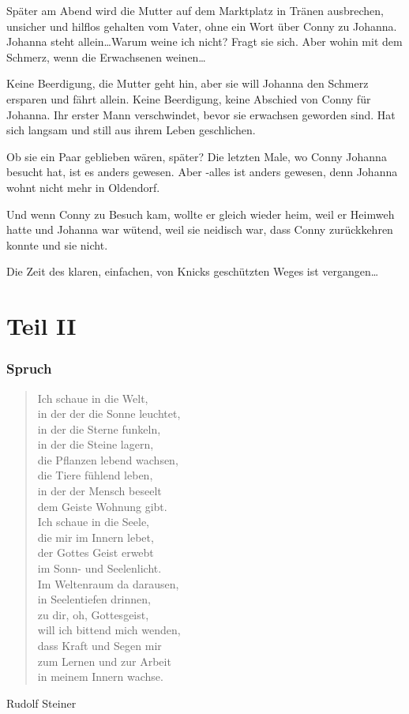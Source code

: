 \documentclass[10pt,a5paper]{book}
\newenvironment{dichter}{\begin{flushright}}{\end{flushright}}
\begin{document}
Später am Abend wird die Mutter auf dem Marktplatz in Tränen ausbrechen, unsicher und hilflos gehalten vom Vater, ohne ein Wort über Conny zu Johanna. Johanna steht allein\dots Warum weine ich nicht? Fragt sie sich.
Aber wohin mit  dem Schmerz, wenn die Erwachsenen weinen\dots

Keine Beerdigung, die Mutter geht hin, aber sie will Johanna den Schmerz ersparen und fährt allein. Keine Beerdigung, keine Abschied von Conny für Johanna. Ihr erster Mann verschwindet, bevor sie erwachsen geworden sind. Hat sich langsam und still aus ihrem Leben geschlichen. 

Ob sie ein Paar geblieben wären, später? Die letzten Male, wo Conny Johanna besucht hat, ist es anders gewesen. Aber -alles ist anders gewesen, denn Johanna wohnt nicht mehr in Oldendorf. 

Und wenn Conny zu Besuch kam, wollte er gleich wieder heim, weil er Heimweh hatte und Johanna war wütend, weil sie neidisch war, dass Conny zurückkehren konnte und sie nicht. 

Die Zeit des klaren, einfachen, von Knicks geschützten Weges ist vergangen\dots


\part*{Teil II}


\section*{Spruch}



\begin{verse}
Ich schaue in die Welt,\\
in der der die Sonne leuchtet,\\
in der die Sterne funkeln,\\
in der die Steine lagern,\\
die Pflanzen lebend wachsen, \\
die Tiere fühlend leben, \\
in der der Mensch beseelt\\
dem Geiste Wohnung gibt.\\
Ich schaue in die Seele,\\
 die mir im Innern lebet, \\
der Gottes Geist erwebt\\
im Sonn- und Seelenlicht.\\
Im Weltenraum da darausen,\\
in Seelentiefen drinnen, \\
zu dir, oh, Gottesgeist,\\
will ich bittend mich wenden,\\
dass Kraft und Segen mir\\
zum Lernen und zur Arbeit\\
in meinem Innern wachse.  
\end{verse}
\begin{dichter}Rudolf Steiner\end{dichter}
\end{document}
